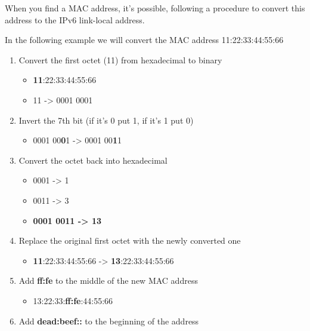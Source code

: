 \documentclass{assets/ipesethesis}
\providecommand{\tightlist}{%
  \setlength{\itemsep}{0pt}\setlength{\parskip}{0pt}}
\begin{document}
When you find a MAC address, it's possible, following a procedure to convert this address to the IPv6 link-local address.

In the following example we will convert the MAC address 11:22:33:44:55:66

\begin{enumerate}
\def\labelenumi{\arabic{enumi}.}
\tightlist
\item
  Convert the first octet (11) from hexadecimal to binary

  \begin{itemize}
  \tightlist
  \item
    \textbf{11}:22:33:44:55:66\\
  \item
    11 -\textgreater{} 0001 0001\\
  \end{itemize}
\item
  Invert the 7th bit (if it's 0 put 1, if it's 1 put 0)

  \begin{itemize}
  \tightlist
  \item
    0001 00\textbf{0}1 -\textgreater{} 0001 00\textbf{1}1\\
  \end{itemize}
\item
  Convert the octet back into hexadecimal

  \begin{itemize}
  \tightlist
  \item
    0001 -\textgreater{} 1\\
  \item
    0011 -\textgreater{} 3\\
  \item
    \textbf{0001 0011 -\textgreater{} 13}\\
  \end{itemize}
\item
  Replace the original first octet with the newly converted one

  \begin{itemize}
  \tightlist
  \item
    \textbf{11}:22:33:44:55:66 -\textgreater{} \textbf{13}:22:33:44:55:66\\
  \end{itemize}
\item
  Add \textbf{ff:fe} to the middle of the new MAC address

  \begin{itemize}
  \tightlist
  \item
    13:22:33:\textbf{ff:fe}:44:55:66\\
  \end{itemize}
\item
  Add \textbf{dead:beef::} to the beginning of the address


\end{enumerate}
\end{document}
